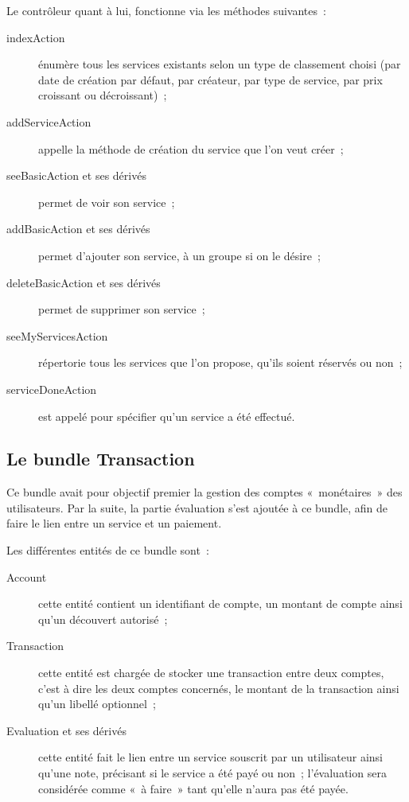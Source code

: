 Le contrôleur quant à lui, fonctionne via les méthodes suivantes~:
\begin{description}
    \item [indexAction] énumère tous les services existants selon un type de classement choisi (par date de création par défaut, par créateur, par type de service, par prix croissant ou décroissant)~;
    \item [addServiceAction] appelle la méthode de création du service que l'on veut créer~;
    \item [seeBasicAction et ses dérivés] permet de voir son service~;
    \item [addBasicAction et ses dérivés] permet d'ajouter son service, à un groupe si on le désire~;
    \item [deleteBasicAction et ses dérivés] permet de supprimer son service~;
    \item [seeMyServicesAction] répertorie tous les services que l'on propose, qu'ils soient réservés ou non~;
    \item [serviceDoneAction] est appelé pour spécifier qu'un service a été effectué.
\end{description}

\subsection{Le bundle Transaction}

Ce bundle avait pour objectif premier la gestion des comptes «~monétaires~» des utilisateurs. Par la suite, la partie évaluation s'est ajoutée à ce bundle, afin de faire le lien entre un service et un paiement.

Les différentes entités de ce bundle sont~:
\begin{description}
    \item [Account] cette entité contient un identifiant de compte, un montant de compte ainsi qu'un découvert autorisé~;
    \item [Transaction] cette entité est chargée de stocker une transaction entre deux comptes, c'est à dire les deux comptes concernés, le montant de la transaction ainsi qu'un libellé optionnel~;
    \item [Evaluation et ses dérivés] cette entité fait le lien entre un service souscrit par un utilisateur ainsi qu'une note, précisant si le service a été payé ou non~; l'évaluation sera considérée comme «~à faire~» tant qu'elle n'aura pas été payée.
\end{description}

